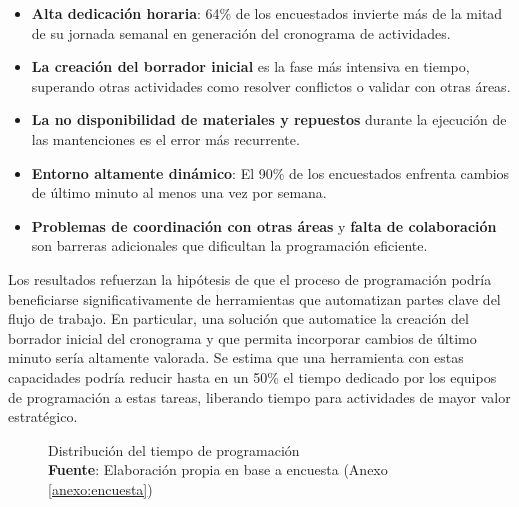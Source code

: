 \documentclass{article}
\begin{document}
\begin{itemize}
    \item \textbf{Alta dedicación horaria}: 64\% de los encuestados invierte más de la mitad de su jornada semanal en generación del cronograma de actividades.
    \item \textbf{La creación del borrador inicial} es la fase más intensiva en tiempo, superando otras actividades como resolver conflictos o validar con otras áreas.
    \item \textbf{La no disponibilidad de materiales y repuestos} durante la ejecución de las mantenciones es el error más recurrente.
    \item \textbf{Entorno altamente dinámico}: El 90\% de los encuestados enfrenta cambios de último minuto al menos una vez por semana.
    \item \textbf{Problemas de coordinación con otras áreas} y \textbf{falta de colaboración} son barreras adicionales que dificultan la programación eficiente.
\end{itemize}

Los resultados refuerzan la hipótesis de que el proceso de programación podría beneficiarse significativamente de herramientas que automatizan partes clave del flujo de trabajo. En particular, una solución que automatice la creación del borrador inicial del cronograma y que permita incorporar cambios de último minuto sería altamente valorada. Se estima que una herramienta con estas capacidades podría reducir hasta en un 50\% el tiempo dedicado por los equipos de programación a estas tareas, liberando tiempo para actividades de mayor valor estratégico.

\begin{figure}[htbp]
    \centering
    \captionsetup{justification=centering} %
    \caption{Distribución del tiempo de programación \\ \textbf{Fuente}: Elaboración propia en base a encuesta (Anexo \ref{anexo:encuesta})}
    \label{fig:pie_chart}
  \end{figure}
\end{document}

